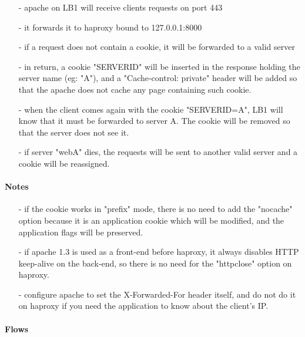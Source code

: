 \begin{itemize}
\item[-] apache on LB1 will receive clients requests on port 443
\item[-] it forwards it to haproxy bound to 127.0.0.1:8000
\item[-] if a request does not contain a cookie, it will be forwarded to a valid
   server
\item[-] in return, a cookie "SERVERID" will be inserted in the response holding the
   server name (eg: "A"), and a "Cache-control: private" header will be added
   so that the apache does not cache any page containing such cookie.
\item[-] when the client comes again with the cookie "SERVERID=A", LB1 will know that
   it must be forwarded to server A. The cookie will be removed so that the
   server does not see it.
\item[-] if server "webA" dies, the requests will be sent to another valid server
   and a cookie will be reassigned.
\end{itemize}

\paragraph{Notes}

\begin{itemize}
\item[-] if the cookie works in "prefix" mode, there is no need to add the "nocache"
   option because it is an application cookie which will be modified, and the
   application flags will be preserved.
\item[-] if apache 1.3 is used as a front-end before haproxy, it always disables
   HTTP keep-alive on the back-end, so there is no need for the "httpclose"
   option on haproxy.
\item[-] configure apache to set the X-Forwarded-For header itself, and do not do
   it on haproxy if you need the application to know about the client's IP.
\end{itemize}

\paragraph{Flows}


